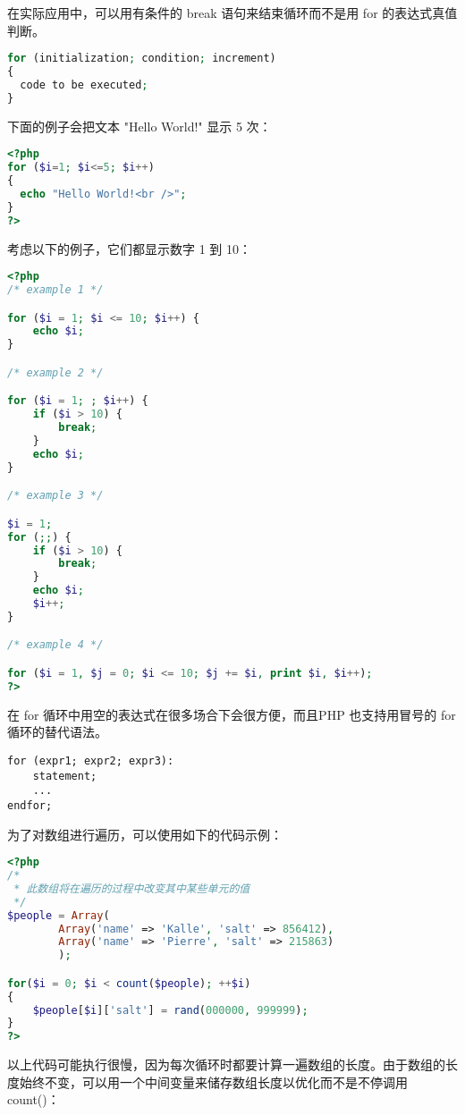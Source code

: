 在实际应用中，可以用有条件的 break 语句来结束循环而不是用 for 的表达式真值判断。

\begin{lstlisting}[language=PHP]
for (initialization; condition; increment)
{
  code to be executed;
}
\end{lstlisting}

下面的例子会把文本 "Hello World!" 显示 5 次：

\begin{lstlisting}[language=PHP]
<?php
for ($i=1; $i<=5; $i++)
{
  echo "Hello World!<br />";
}
?>
\end{lstlisting}

考虑以下的例子，它们都显示数字 1 到 10：

\begin{lstlisting}[language=PHP]
<?php
/* example 1 */

for ($i = 1; $i <= 10; $i++) {
    echo $i;
}

/* example 2 */

for ($i = 1; ; $i++) {
    if ($i > 10) {
        break;
    }
    echo $i;
}

/* example 3 */

$i = 1;
for (;;) {
    if ($i > 10) {
        break;
    }
    echo $i;
    $i++;
}

/* example 4 */

for ($i = 1, $j = 0; $i <= 10; $j += $i, print $i, $i++);
?>
\end{lstlisting}


在 for 循环中用空的表达式在很多场合下会很方便，而且PHP 也支持用冒号的 for 循环的替代语法。


\begin{verbatim}
for (expr1; expr2; expr3):
    statement;
    ...
endfor;
\end{verbatim}

为了对数组进行遍历，可以使用如下的代码示例：

\begin{lstlisting}[language=PHP]
<?php
/*
 * 此数组将在遍历的过程中改变其中某些单元的值
 */
$people = Array(
        Array('name' => 'Kalle', 'salt' => 856412), 
        Array('name' => 'Pierre', 'salt' => 215863)
        );

for($i = 0; $i < count($people); ++$i)
{
    $people[$i]['salt'] = rand(000000, 999999);
}
?>
\end{lstlisting}

以上代码可能执行很慢，因为每次循环时都要计算一遍数组的长度。由于数组的长度始终不变，可以用一个中间变量来储存数组长度以优化而不是不停调用 count()：

